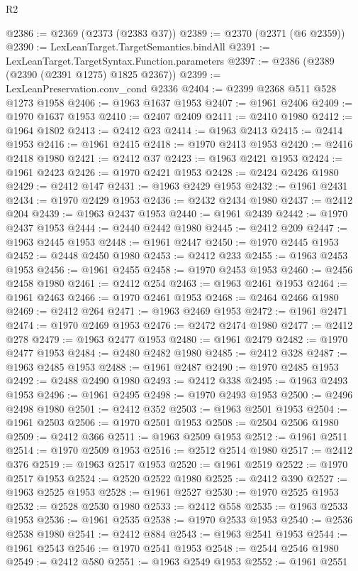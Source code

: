 \begin{lexlean}{R2}
\begin{coremodule}
@2386 := @2369 (@2373 (@2383 @37))
@2389 := @2370 (@2371 (@6 @2359))
@2390 := LexLeanTarget.TargetSemantics.bindAll
@2391 := LexLeanTarget.TargetSyntax.Function.parameters
@2397 := @2386 (@2389 (@2390 (@2391 @1275) @1825 @2367))
@2399 := LexLeanPreservation.conv_cond @2336
@2404 := @2399 @2368 @511 @528 @1273 @1958
@2406 := @1963 @1637 @1953
@2407 := @1961 @2406
@2409 := @1970 @1637 @1953
@2410 := @2407 @2409
@2411 := @2410 @1980
@2412 := @1964 @1802
@2413 := @2412 @23
@2414 := @1963 @2413
@2415 := @2414 @1953
@2416 := @1961 @2415
@2418 := @1970 @2413 @1953
@2420 := @2416 @2418 @1980
@2421 := @2412 @37
@2423 := @1963 @2421 @1953
@2424 := @1961 @2423
@2426 := @1970 @2421 @1953
@2428 := @2424 @2426 @1980
@2429 := @2412 @147
@2431 := @1963 @2429 @1953
@2432 := @1961 @2431
@2434 := @1970 @2429 @1953
@2436 := @2432 @2434 @1980
@2437 := @2412 @204
@2439 := @1963 @2437 @1953
@2440 := @1961 @2439
@2442 := @1970 @2437 @1953
@2444 := @2440 @2442 @1980
@2445 := @2412 @209
@2447 := @1963 @2445 @1953
@2448 := @1961 @2447
@2450 := @1970 @2445 @1953
@2452 := @2448 @2450 @1980
@2453 := @2412 @233
@2455 := @1963 @2453 @1953
@2456 := @1961 @2455
@2458 := @1970 @2453 @1953
@2460 := @2456 @2458 @1980
@2461 := @2412 @254
@2463 := @1963 @2461 @1953
@2464 := @1961 @2463
@2466 := @1970 @2461 @1953
@2468 := @2464 @2466 @1980
@2469 := @2412 @264
@2471 := @1963 @2469 @1953
@2472 := @1961 @2471
@2474 := @1970 @2469 @1953
@2476 := @2472 @2474 @1980
@2477 := @2412 @278
@2479 := @1963 @2477 @1953
@2480 := @1961 @2479
@2482 := @1970 @2477 @1953
@2484 := @2480 @2482 @1980
@2485 := @2412 @328
@2487 := @1963 @2485 @1953
@2488 := @1961 @2487
@2490 := @1970 @2485 @1953
@2492 := @2488 @2490 @1980
@2493 := @2412 @338
@2495 := @1963 @2493 @1953
@2496 := @1961 @2495
@2498 := @1970 @2493 @1953
@2500 := @2496 @2498 @1980
@2501 := @2412 @352
@2503 := @1963 @2501 @1953
@2504 := @1961 @2503
@2506 := @1970 @2501 @1953
@2508 := @2504 @2506 @1980
@2509 := @2412 @366
@2511 := @1963 @2509 @1953
@2512 := @1961 @2511
@2514 := @1970 @2509 @1953
@2516 := @2512 @2514 @1980
@2517 := @2412 @376
@2519 := @1963 @2517 @1953
@2520 := @1961 @2519
@2522 := @1970 @2517 @1953
@2524 := @2520 @2522 @1980
@2525 := @2412 @390
@2527 := @1963 @2525 @1953
@2528 := @1961 @2527
@2530 := @1970 @2525 @1953
@2532 := @2528 @2530 @1980
@2533 := @2412 @558
@2535 := @1963 @2533 @1953
@2536 := @1961 @2535
@2538 := @1970 @2533 @1953
@2540 := @2536 @2538 @1980
@2541 := @2412 @884
@2543 := @1963 @2541 @1953
@2544 := @1961 @2543
@2546 := @1970 @2541 @1953
@2548 := @2544 @2546 @1980
@2549 := @2412 @580
@2551 := @1963 @2549 @1953
@2552 := @1961 @2551

\end{coremodule}
\end{lexlean}

